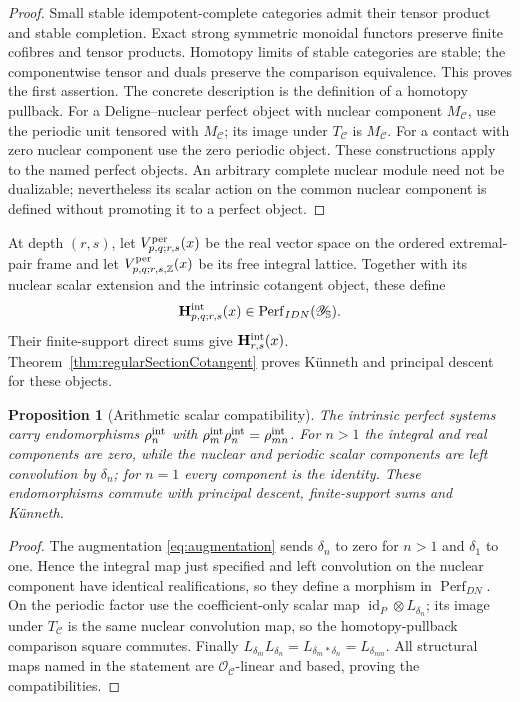 \documentclass[11pt]{amsart}
\newtheorem{proposition}[theorem]{Proposition}
\theoremstyle{definition}
\theoremstyle{remark}
\newcommand{\Z}{\mathbb Z}
\begin{document}
\begin{proof}
Small stable idempotent-complete categories admit their tensor product and
stable completion.  Exact strong symmetric monoidal functors preserve
finite cofibres and tensor products.  Homotopy limits of stable categories
are stable; the componentwise tensor and duals preserve the comparison
equivalence.  This proves the first assertion.  The concrete description
is the definition of a homotopy pullback.  For a Deligne--nuclear perfect object
with nuclear component $M_{\mathcal C}$, use the periodic unit tensored
with $M_{\mathcal C}$; its image under $T_{\mathcal C}$ is
$M_{\mathcal C}$.  For a contact with zero nuclear component use the zero
periodic object.  These constructions apply to the named perfect objects.
An arbitrary complete nuclear module need not be dualizable; nevertheless
its scalar action on the common nuclear component is defined without
promoting it to a perfect object.
\end{proof}

At depth $(r,s)$, let $V_{p,q;r,s}^{\rm per}(x)$ be the real vector space
on the ordered extremal-pair frame and let $V_{p,q;r,s,\Z}^{\rm per}(x)$ be
its free integral lattice.  Together with its nuclear scalar extension and
the intrinsic cotangent object, these define
\begin{equation}\label{eq:intrinsicPerfectCohomology}
 \mathbf H_{p,q;r,s}^{\rm int}(x)
 \in\operatorname{Perf}_{IDN}(\mathscr Y_{\mathbb S}).
\end{equation}
Their finite-support direct sums give $\mathbf H_{r,s}^{\rm int}(x)$.
Theorem~\ref{thm:regularSectionCotangent} proves K\"unneth and principal
descent for these objects.

\begin{proposition}[Arithmetic scalar compatibility]
\label{prop:intrinsicArithmeticAction}
The intrinsic perfect systems carry endomorphisms $\rho_n^{\rm int}$ with
$\rho_m^{\rm int}\rho_n^{\rm int}=\rho_{mn}^{\rm int}$.  For $n>1$ the
integral and real components are zero, while the nuclear and periodic
scalar components are left convolution by $\delta_n$; for $n=1$ every
component is the identity.  These endomorphisms commute with principal
descent, finite-support sums and K\"unneth.
\end{proposition}

\begin{proof}
The augmentation \eqref{eq:augmentation} sends $\delta_n$ to zero for
$n>1$ and $\delta_1$ to one.  Hence the integral map just specified and
left convolution on the nuclear component have identical realifications,
so they define a morphism in $\operatorname{Perf}_{DN}$.  On the periodic
factor use the coefficient-only scalar map
$\operatorname{id}_P\otimes L_{\delta_n}$; its image under
$T_{\mathcal C}$ is the same nuclear convolution map, so the homotopy-pullback
comparison square commutes.  Finally
$L_{\delta_m}L_{\delta_n}=L_{\delta_m*\delta_n}=L_{\delta_{mn}}$.
All structural maps named in the statement are
$\mathcal O_{\mathcal C}$-linear and based, proving the compatibilities.
\end{proof}
\end{document}

